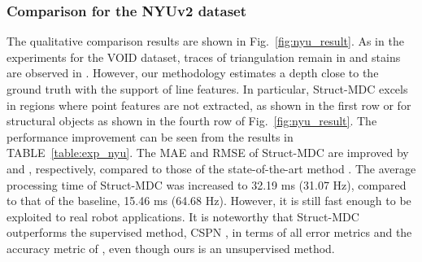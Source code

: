 \subsubsection{Comparison for the NYUv2 dataset}
The qualitative comparison results are shown in Fig.~\ref{fig:nyu_result}. As in the experiments for the VOID \textcolor{color1}{dataset}, traces of triangulation remain in \cite{void} and stains are observed in \cite{baseline}. However, our methodology estimates \textcolor{color1}{a} depth close to the ground truth with the support of line features. 
In particular, Struct-MDC \textcolor{color1}{excels in} regions where point features are not extracted\textcolor{color1}{,} as shown in the first row or \textcolor{color1}{for} structural objects \textcolor{color1}{as shown in} the fourth row of Fig.~\ref{fig:nyu_result}. 
\textcolor{color1}{T}he performance improvement \textcolor{color1}{can be seen from the results in} TABLE~\ref{table:exp_nyu}. 
\textcolor{color1}{The} MAE and RMSE \textcolor{color1}{of Struct-MDC are} improved by  and , respectively, \textcolor{color1}{compared to those of the state-of-the-art method} \cite{baseline}. 
\textcolor{color3}{The average processing time of Struct-MDC was increased to 32.19 ms (31.07 Hz), compared to that of the baseline, 15.46 ms (64.68 Hz). However, it is still fast enough to be exploited to real robot applications.}
It is noteworthy that Struct-MDC outperforms the supervised method\textcolor{color1}{,} CSPN \cite{cspn}\textcolor{color1}{,} in \textcolor{color1}{terms of} all error metrics and \textcolor{color1}{the} accuracy metric of , even though ours is an unsupervised method. 



